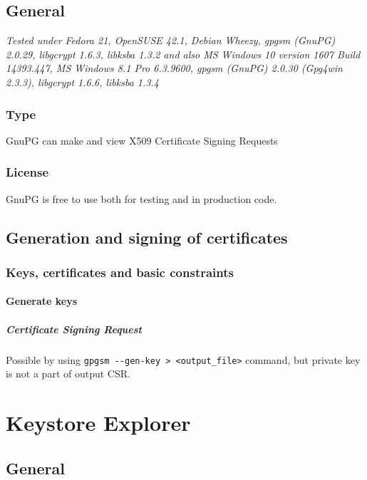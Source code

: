 \documentclass[10pt, a4paper]{report}
\begin{document}
\section{General}

\textit{Tested under Fedora 21, OpenSUSE 42.1, Debian Wheezy, gpgsm (GnuPG) 2.0.29, libgcrypt 1.6.3, libksba 1.3.2 and also MS Windows 10 version 1607 Build 14393.447, MS Windows 8.1 Pro 6.3.9600, gpgsm (GnuPG) 2.0.30 (Gpg4win 2.3.3), libgcrypt 1.6.6, libksba 1.3.4}

  \subsection{Type}
GnuPG can make and view X509 Certificate Signing Requests

  \subsection{License}
GnuPG is free to use both for testing and in production code.
  
\section{Generation and signing of certificates}

  \subsection{Keys, certificates and basic constraints}
  
    \subsubsection{Generate keys}
    
      \paragraph{Certificate Signing Request}
Possible by using \verb+gpgsm --gen-key > <output_file>+ command, but private key is not a part of output CSR.     


\chapter{Keystore Explorer}

\section{General}
\end{document}
